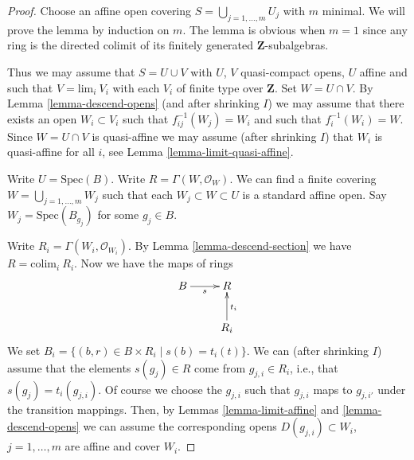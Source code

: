\begin{proof}
Choose an affine open covering $S = \bigcup_{j = 1, \ldots, m} U_j$
with $m$ minimal. We will prove the lemma by induction on $m$.
The lemma is obvious when $m = 1$ since any ring is the
directed colimit of its finitely generated $\mathbf{Z}$-subalgebras.

\medskip\noindent
Thus we may assume that $S = U \cup V$ with $U$, $V$ quasi-compact
opens, $U$ affine and such that $V = \text{lim}_i\ V_i$ with
each $V_i$ of finite type over $\mathbf{Z}$. Set $W = U \cap V$.
By Lemma \ref{lemma-descend-opens}
(and after shrinking $I$) we may assume that there exists
an open $W_i \subset V_i$ such that $f_{ij}^{-1}(W_j) = W_i$
and such that $f_i^{-1}(W_i) = W$. Since $W = U \cap V$
is quasi-affine we may assume (after shrinking $I$)
that $W_i$ is quasi-affine for all $i$, see
Lemma \ref{lemma-limit-quasi-affine}.

\medskip\noindent
Write $U = \text{Spec}(B)$. Write $R = \Gamma(W, \mathcal{O}_W)$.
We can find a finite covering $W = \bigcup_{j = 1, \ldots, m} W_j$
such that each $W_j \subset W \subset U$ is a standard affine
open. Say $W_j = \text{Spec}(B_{g_j})$ for some $g_j \in B$.

\medskip\noindent
Write $R_i = \Gamma(W_i, \mathcal{O}_{W_i})$.
By Lemma \ref{lemma-descend-section} we have $R = \text{colim}_i\ R_i$.
Now we have the maps of rings
$$
\xymatrix{
B \ar[r]_s & R \\
& R_i \ar[u]_{t_i}
}
$$
We set $B_i = \{(b, r) \in B \times R_i \mid s(b) = t_i(t)\}$.
We can (after shrinking $I$) assume that the elements
$s(g_j) \in R$ come from $g_{j, i} \in R_i$, i.e., that
$s(g_j) = t_i(g_{j, i})$. Of course we choose the $g_{j, i}$
such that $g_{j, i}$ maps to $g_{j, i'}$ under the transition mappings.
Then, by Lemmas \ref{lemma-limit-affine} and \ref{lemma-descend-opens}
we can assume the corresponding
opens $D(g_{j, i}) \subset W_i$, $j = 1, \ldots, m$
are affine and cover $W_i$.


\end{proof}
